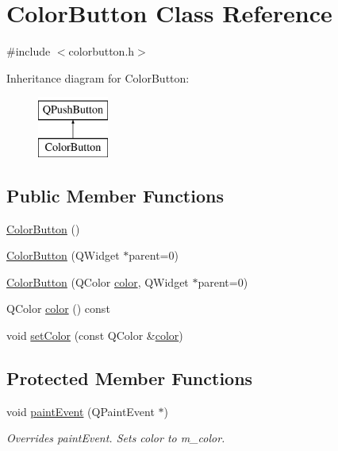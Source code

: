 \hypertarget{class_color_button}{}\section{Color\+Button Class Reference}
\label{class_color_button}


{\ttfamily \#include $<$colorbutton.\+h$>$}

Inheritance diagram for Color\+Button\+:\begin{figure}[H]
\begin{center}
\leavevmode
\includegraphics[height=2.000000cm]{class_color_button}
\end{center}
\end{figure}
\subsection*{Public Member Functions}
\begin{DoxyCompactItemize}
\item 
\hyperlink{class_color_button_a4b8e318941c5c69efd5a610fd7edb51e}{Color\+Button} ()
\item 
\hyperlink{class_color_button_a128b21900f22efdc9d71d0bffa0b64f8}{Color\+Button} (Q\+Widget $\ast$parent=0)
\item 
\hyperlink{class_color_button_a16f9cc31b3476fc5cb900e3692d4f49c}{Color\+Button} (Q\+Color \hyperlink{class_color_button_a7583a20c9a126ba93e344ea728c19954}{color}, Q\+Widget $\ast$parent=0)
\item 
Q\+Color \hyperlink{class_color_button_a7583a20c9a126ba93e344ea728c19954}{color} () const
\item 
void \hyperlink{class_color_button_ad0d3747c9ceb3ed57d3f513f42fd4cf2}{set\+Color} (const Q\+Color \&\hyperlink{class_color_button_a7583a20c9a126ba93e344ea728c19954}{color})
\end{DoxyCompactItemize}
\subsection*{Protected Member Functions}
\begin{DoxyCompactItemize}
\item 
void \hyperlink{class_color_button_ae7b2847c9974fb52f80d54dafc7a0f00}{paint\+Event} (Q\+Paint\+Event $\ast$)
\begin{DoxyCompactList}\small\item\em Overrides paint\+Event. Sets color to m\+\_\+color. \end{DoxyCompactList}\end{DoxyCompactItemize}
